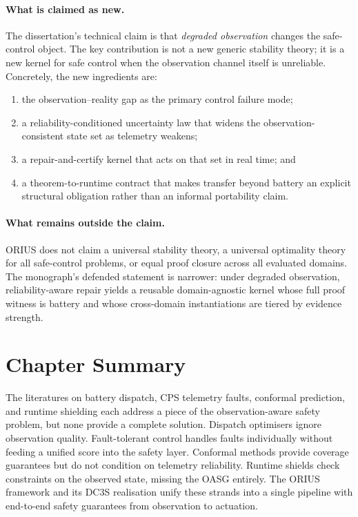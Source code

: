\paragraph{What is claimed as new.}
The dissertation's technical claim is that \emph{degraded observation}
changes the safe-control object.  The key contribution is not a new generic
stability theory; it is a new kernel for safe control when the observation
channel itself is unreliable.  Concretely, the new ingredients are:
\begin{enumerate}
  \item the observation--reality gap as the primary control failure mode;
  \item a reliability-conditioned uncertainty law that widens the
    observation-consistent state set as telemetry weakens;
  \item a repair-and-certify kernel that acts on that set in real time; and
  \item a theorem-to-runtime contract that makes transfer beyond battery an
    explicit structural obligation rather than an informal portability claim.
\end{enumerate}

\paragraph{What remains outside the claim.}
ORIUS does not claim a universal stability theory, a universal optimality
theory for all safe-control problems, or equal proof closure across all
evaluated domains.  The monograph's defended statement is narrower: under
degraded observation, reliability-aware repair yields a reusable
domain-agnostic kernel whose full proof witness is battery and whose
cross-domain instantiations are tiered by evidence strength.

\section{Chapter Summary}

The literatures on battery dispatch, CPS telemetry faults, conformal
prediction, and runtime shielding each address a piece of the
observation-aware safety problem, but none provide a complete solution.
Dispatch optimisers ignore observation quality.  Fault-tolerant control
handles faults individually without feeding a unified score into the
safety layer.  Conformal methods provide coverage guarantees but do not
condition on telemetry reliability.  Runtime shields check constraints on
the observed state, missing the OASG entirely.  The ORIUS framework and
its DC3S realisation unify these strands into a single pipeline with
end-to-end safety guarantees from observation to actuation.

